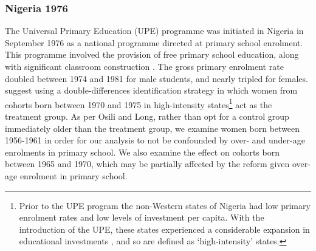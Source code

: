 \documentclass{article}[12pt,subeqn]
\begin{document}
\begin{spacing}{1.4}
\subsubsection{Nigeria 1976}
\label{ssscn:empiricsNigeria}
The Universal Primary Education (UPE) programme was initiated in Nigeria in September 1976 as a national programme
directed at primary school enrolment. This programme involved the provision of free primary school education, 
along with significant classroom construction \citep{OsiliLong2008}. The gross primary enrolment rate doubled
between 1974 and 1981 for male students, and nearly tripled for females.  \citet{OsiliLong2008} suggest using a 
double-differences identification strategy in which women from cohorts born between 1970 and 1975 in high-intensity 
states\footnote{Prior to the UPE program the non-Western states of Nigeria had low primary enrolment rates and 
low levels of investment per capita.  With the introduction of the UPE, these states experienced a considerable 
expansion in educational investments \citep{OsiliLong2008}, and so are defined as `high-intensity' states.} act 
as the treatment group. As per Osili and Long, rather than opt for a control group immediately older than the 
treatment group, we examine women born between 1956-1961 in order for our analysis to not be confounded by over- 
and under-age enrolments in primary school.  We also examine the effect on cohorts born between 1965 and 1970,
which may be partially affected by the reform given over-age enrolment in primary school.


\end{spacing}
\end{document}
